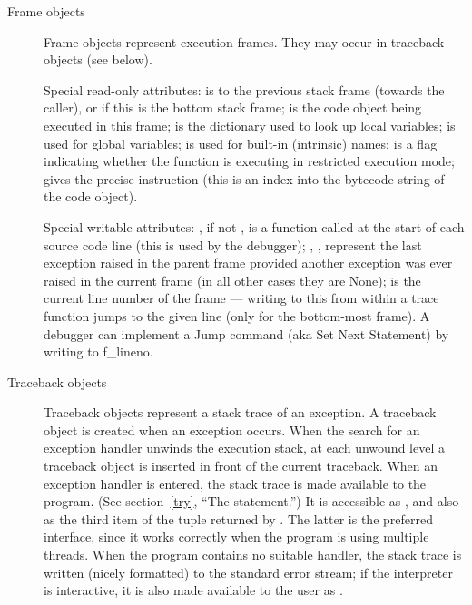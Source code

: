 \begin{description}
\begin{description}
\item[Frame objects]
Frame objects represent execution frames.  They may occur in traceback
objects (see below).

Special read-only attributes:  is to the previous
stack frame (towards the caller), or  if this is the bottom
stack frame;  is the code object being executed in this
frame;  is the dictionary used to look up local
variables;  is used for global variables;
 is used for built-in (intrinsic) names;
 is a flag indicating whether the function is
executing in restricted execution mode;  gives the
precise instruction (this is an index into the bytecode string of
the code object).

Special writable attributes: , if not , is
a function called at the start of each source code line (this is used
by the debugger); , ,
 represent the last exception raised in the
parent frame provided another exception was ever raised in the current
frame (in all other cases they are None);  is the
current line number of the frame --- writing to this from within a
trace function jumps to the given line (only for the bottom-most
frame).  A debugger can implement a Jump command (aka Set Next
Statement) by writing to f_lineno.

\item[Traceback objects] \label{traceback}
Traceback objects represent a stack trace of an exception.  A
traceback object is created when an exception occurs.  When the search
for an exception handler unwinds the execution stack, at each unwound
level a traceback object is inserted in front of the current
traceback.  When an exception handler is entered, the stack trace is
made available to the program.
(See section~\ref{try}, ``The  statement.'')
It is accessible as , and also as the third
item of the tuple returned by .  The latter is
the preferred interface, since it works correctly when the program is
using multiple threads.
When the program contains no suitable handler, the stack trace is written
(nicely formatted) to the standard error stream; if the interpreter is
interactive, it is also made available to the user as
.


\end{description}
\end{description}

